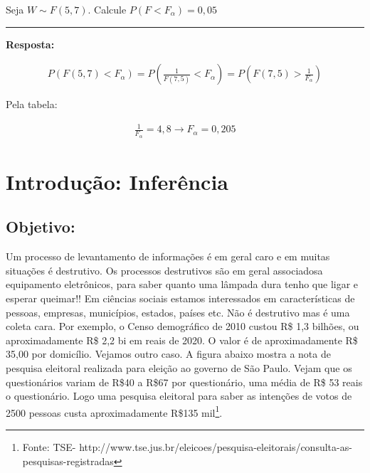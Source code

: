 \documentclass[
  letterpaper,
  DIV=11,
  numbers=noendperiod]{scrartcl}
\begin{document}
\begin{exemplo}

Seja \(W \sim F(5,7)\). Calcule \(P(F<F_{\alpha})=0,05\)

\begin{center}\rule{0.5\linewidth}{0.5pt}\end{center}

\textbf{Resposta:}

\[\begin{array}{ccc}
P(F(5,7)<F_{\alpha})= P(\frac{1}{F(7,5)}<F_{\alpha})=P(F(7,5)>\frac{1}{F_{\alpha}})
\end{array}\]

Pela tabela:

\[\begin{array}{ccc}
\frac{1}{F_{\alpha}}=4,8 \rightarrow F_{\alpha}=0,205
\end{array}\]

\end{exemplo}

\section{Introdução: Inferência}\label{introduuxe7uxe3o-inferuxeancia}

\subsection{Objetivo:}\label{objetivo}

Um processo de levantamento de informações é em geral caro e em muitas
situações é destrutivo. Os processos destrutivos são em geral
associadosa equipamento eletrônicos, para saber quanto uma lâmpada dura
tenho que ligar e esperar queimar!! Em ciências sociais estamos
interessados em características de pessoas, empresas, municípios,
estados, países etc. Não é destrutivo mas é uma coleta cara. Por
exemplo, o Censo demográfico de 2010 custou R\$ 1,3 bilhões, ou
aproximadamente R\$ 2,2 bi em reais de 2020. O valor é de
aproximadamente R\$ 35,00 por domicílio. Vejamos outro caso. A figura
abaixo mostra a nota de pesquisa eleitoral realizada para eleição ao
governo de São Paulo. Vejam que os questionários variam de R\$40 a R\$67
por questionário, uma média de R\$ 53 reais o questionário. Logo uma
pesquisa eleitoral para saber as intenções de votos de 2500 pessoas
custa aproximadamente R\$135 mil\footnote{Fonte: TSE-
  http://www.tse.jus.br/eleicoes/pesquisa-eleitorais/consulta-as-pesquisas-registradas}.\\
\end{document}
